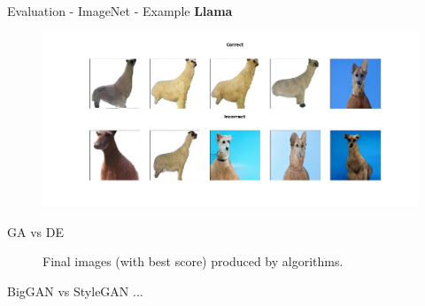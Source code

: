 \documentclass[t]{beamer}
\begin{document}
\begin{frame}[c]{Evaluation - ImageNet - Example}
\textbf{Llama}
\begin{figure}
    \centering
    \includegraphics[scale=0.25]{llama.png}
\end{figure} 
\end{frame}

\begin{frame}{GA vs DE}
\begin{figure}[h]
    \centering
    \qquad
    \caption{Final images (with best score) produced by algorithms.}
\end{figure}
\end{frame}

\begin{frame}[c]{BigGAN vs StyleGAN}
...
\end{frame}
\end{document}
